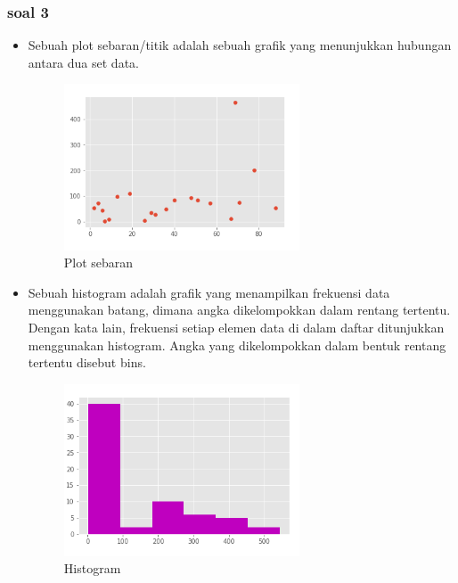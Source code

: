\subsubsection{soal 3}
\begin{itemize}
\item Sebuah plot sebaran/titik adalah sebuah grafik yang menunjukkan hubungan antara dua set data.

\begin{figure}[H]
\centering
\includegraphics[width=7cm]{figures/6/1174009/1b.png}
\caption{Plot sebaran}
\label{dwiyul}
\end{figure}

\item Sebuah histogram adalah grafik yang menampilkan frekuensi data menggunakan batang, dimana angka dikelompokkan dalam rentang tertentu. Dengan kata lain, frekuensi setiap elemen data di dalam daftar ditunjukkan menggunakan histogram. Angka yang dikelompokkan dalam bentuk rentang tertentu disebut bins.

\begin{figure}[H]
\centering
\includegraphics[width=7cm]{figures/6/1174009/1c.png}
\caption{Histogram}
\label{dwiyul}
\end{figure}


\end{itemize}
